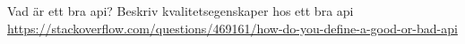 \begin{Slide}{Vad är ett bra api?}
\TODO Beskriv kvalitetsegenskaper hos ett bra api\\
\href{https://stackoverflow.com/questions/469161/how-do-you-define-a-good-or-bad-api}{https://stackoverflow.com/questions/469161/how-do-you-define-a-good-or-bad-api}  
\end{Slide}




